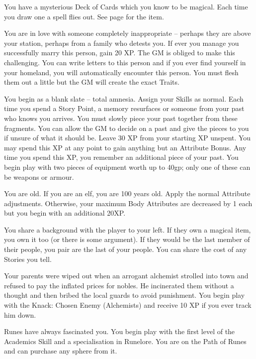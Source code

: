 \begin{multicols}{2}
\begin{list}{\addtocounter{list}{1}\textbf{:}}{\raggedleft}
\item{You have a mysterious Deck of Cards which you know to be magical.  Each time you draw one a spell flies out.  See page \pageref{deckofmanythings} for the item.}

\item{You are in love with someone completely inappropriate -- perhaps they are above your station, perhaps from a family who detests you.  If ever you manage you successfully marry this person, gain 20 XP.  The GM is obliged to make this challenging.  You can write letters to this person and if you ever find yourself in your homeland, you will automatically encounter this person.  You must flesh them out a little but the GM will create the exact Traits.}

\item{You begin as a blank slate -- total amnesia.
Assign your Skills as normal.
Each time you spend a Story Point, a memory resurfaces or someone from your past who knows you arrives.
You must slowly piece your past together from these fragments.
You can allow the GM to decide on a past and give the pieces to you if unsure of what it should be.
Leave 30 XP from your starting XP unspent.
You may spend this XP at any point to gain anything but an Attribute Bonus.
Any time you spend this XP, you remember an additional piece of your past.
You begin play with two pieces of equipment worth up to 40gp; only one of these can be weapons or armour.}

\item{You are old.  If you are an elf, you are 100 years old.  Apply the normal Attribute adjustments.  Otherwise, your maximum Body Attributes are decreased by 1 each but you begin with an additional 20XP.}

\item{You share a background with the player to your left.  If they own a magical item, you own it too (or there is some argument).  If they would be the last member of their people, you pair are the last of your people.  You can share the cost of any Stories you tell.}

\item{Your parents were wiped out when an arrogant alchemist strolled into town and refused to pay the inflated prices for nobles.  He incinerated them without a thought and then bribed the local guards to avoid punishment.  You begin play with the Knack: Chosen Enemy (Alchemists) and receive 10 XP if you ever track him down.}

\item{Runes have always fascinated you.  You begin play with the first level of the Academics Skill and a specialisation in Runelore.  You are on the Path of Runes and can purchase any sphere from it.}


\end{list}
\end{multicols}
